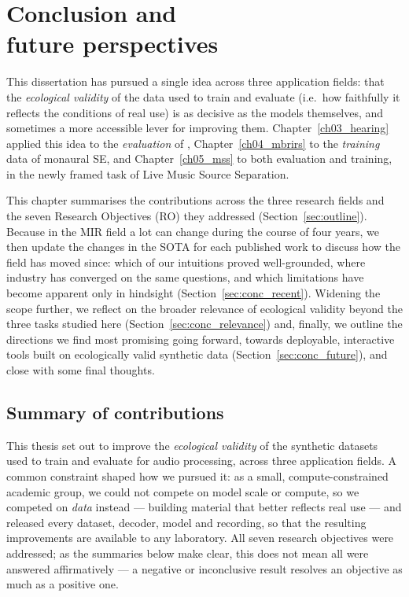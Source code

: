 
\chapter[General Conclusions and Future Perspectives]{Conclusion and\\future perspectives}
\label{ch98_conclusions}

\vspace{3cm}

This dissertation has pursued a single idea across three application fields:
that the \emph{ecological validity} of the data used to train and evaluate  (i.e.\ how faithfully it reflects the conditions of real use) is
as decisive as the models themselves, and sometimes a more accessible lever for
improving them. Chapter~\ref{ch03_hearing} applied this idea to the
\emph{evaluation} of , Chapter~\ref{ch04_mbrirs} to the
\emph{training} data of monaural \acrshort{SE}, and
Chapter~\ref{ch05_mss} to both evaluation and training, in the newly framed task of Live Music Source
Separation. 

This chapter summarises the contributions across the three research fields and the
seven Research Objectives (RO) they addressed
(Section~\ref{sec:outline}). Because in the \acrshort{MIR} field a lot can change during the course of four years, we then update the changes in the \acrshort{SOTA} for each published work to discuss how the field has moved since:
which of our intuitions proved well-grounded, where industry has converged on the same
questions, and which limitations have become apparent only in hindsight
(Section~\ref{sec:conc_recent}). Widening the scope further, we reflect on the
broader relevance of ecological validity beyond the three tasks studied here (Section~\ref{sec:conc_relevance}) and, finally, we outline the directions we find most promising going forward, towards
deployable, interactive tools built on ecologically valid synthetic data
(Section~\ref{sec:conc_future}), and close with some final thoughts.

\section{Summary of contributions}
\label{sec:conc_contributions}
This thesis set out to improve the \emph{ecological validity} of the synthetic
datasets used to train and evaluate  for audio processing,
across three application fields. A common constraint shaped how we pursued it:
as a small, compute-constrained academic group, we could not compete on model
scale or compute, so we competed on \emph{data} instead --- building material
that better reflects real use --- and released every dataset, decoder, model and
recording, so that the resulting improvements are available to any laboratory.
All seven research objectives were addressed; as the summaries below make clear,
this does not mean all were answered affirmatively --- a negative or inconclusive
result resolves an objective as much as a positive one.

